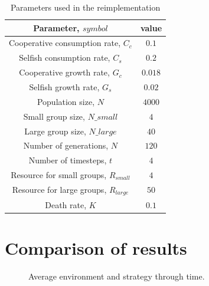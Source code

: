 \documentclass[11pt]{ecsarticle}
\begin{document}
\begin{table}
 \begin{tabular}{|c|c|}\hline
 Parameter, $symbol$ & value \\ \hline
  Cooperative consumption rate, $C_c$	&	$0.1$		\\ \hline
  Selfish consumption rate, $C_s$	&	$0.2$		\\ \hline
  Cooperative growth rate, $G_c$	&	$0.018$		\\ \hline
  Selfish growth rate, $G_s$		&	$0.02$		\\ \hline
  Population size, $N$			&	$4000$		\\ \hline
  Small group size, $N\_small$		&	$4$		\\ \hline
  Large group size, $N\_large$		&	$40$		\\ \hline
  Number of generations, $N$		&	$120$		\\ \hline
  Number of timesteps, $t$		&	$4$		\\ \hline
  Resource for small groups, $R_{small}$&	$4$		\\ \hline
  Resource for large groups, $R_{large}$&	$50$		\\ \hline
  Death rate, $K$			&	$0.1$		\\ \hline
 \end{tabular}
 \caption{Parameters used in the reimplementation}
 \label{table:params}
\end{table}

\section{Comparison of results}\label{sc:reimp:results}

\begin{figure}
\centering     %
{}
\caption{Average environment and strategy through time.}\label{fig:A}
\end{figure}
\end{document}
